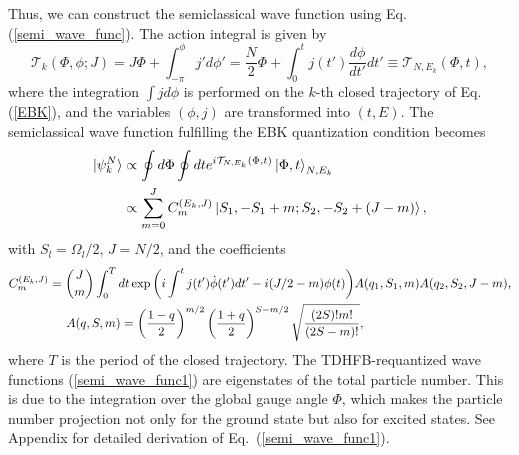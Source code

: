 \documentclass[%
superscriptaddress,
preprint,
showpacs,
nofootinbib,
amsmath,amssymb,
aps,
prc,
floatfix ]%
{revtex4-1}
\begin{document}
Thus, we can construct the semiclassical wave function using
Eq. (\ref{semi_wave_func}).
The action integral is given by
\begin{equation}
	\mathcal{T}_k(\Phi,\phi;J)
	= J\Phi + \int^\phi_{-\pi} j' d\phi' 
	= \frac{N}{2}\Phi + \int^t_0   %
	j(t') \frac{d\phi}{dt'} dt' 
\equiv \mathcal{T}_{N,E_k}(\Phi,t) ,
\end{equation}
where the integration $\int j d\phi$ is performed on the $k$-th
closed trajectory of Eq. (\ref{EBK}), and
the variables $(\phi,j)$ are transformed into $(t,E)$.
The semiclassical wave function fulfilling the EBK quantization condition
becomes
\begin{align}
	\ket{\psi_k^N} &\propto \oint d\Phi \oint dt
	e^{i\mathcal{T}_{N,E_k}(\Phi, t)}
	\ket{\Phi,t}_{N,E_k} \label{semi_wave_func0} \\
  &\propto \sum_{m=0}^{J}C_m^{(E_k,J)}\ket{S_1,-S_1+m;S_2,-S_2+(J-m)} ,
	\label{semi_wave_func1}
\end{align}
with $S_l=\Omega_l/2$, $J=N/2$, and the coefficients
\begin{align}
  C_m^{(E_k,J)} &= \binom{J}{m}\int_0^T dt \exp{\left( i\int^t j(t') \dot{\phi}(t') dt'-i(J/2-m)\phi(t) \right)}A(q_1,S_1,m)A(q_2,S_2,J-m) ,\\
  & \hspace{5mm} A(q,S,m) = \left(\frac{1-q}{2}\right)^{m/2}\left(\frac{1+q}{2}\right)^{S-m/2}\sqrt{\frac{(2S)!m!}{(2S-m)!}}, \hspace{5mm} \nonumber
\end{align}
where $T$ is the period of the closed trajectory.
The TDHFB-requantized wave functions (\ref{semi_wave_func1}) are
eigenstates of the total particle number.
This is due to the integration over the global gauge angle $\Phi$,
which makes the particle number projection not only for the ground state
but also for excited states.
See Appendix for detailed derivation of Eq.~(\ref{semi_wave_func1}). 
\end{document}
